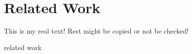 \section{Related Work}\label{section:introduction-related}
This is my real text! Rest might be copied or not be checked!


related work
